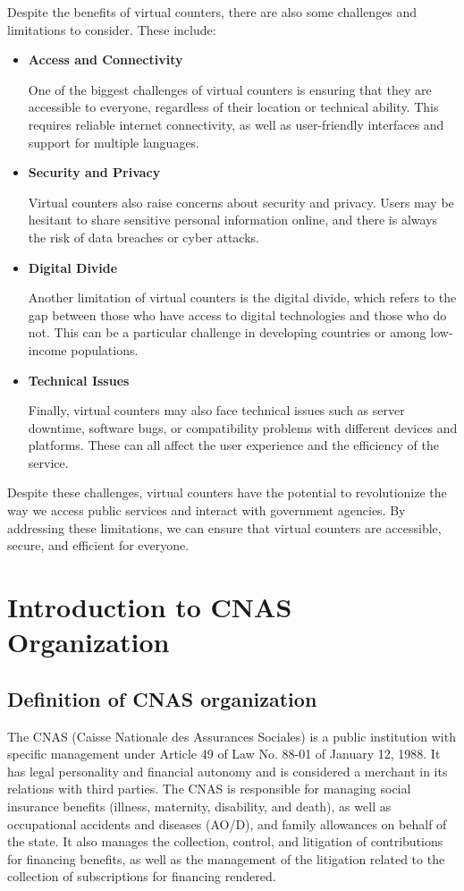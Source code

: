 Despite the benefits of virtual counters, there are also some challenges and limitations to consider. These include:
\begin{itemize}
    \item \textbf{Access and Connectivity}

One of the biggest challenges of virtual counters is ensuring that they are accessible to everyone, regardless of their location or technical ability. This requires reliable internet connectivity, as well as user-friendly interfaces and support for multiple languages.
\item \textbf{Security and Privacy}

Virtual counters also raise concerns about security and privacy. Users may be hesitant to share sensitive personal information online, and there is always the risk of data breaches or cyber attacks.
\item \textbf{Digital Divide}

Another limitation of virtual counters is the digital divide, which refers to the gap between those who have access to digital technologies and those who do not. This can be a particular challenge in developing countries or among low-income populations.
\item \textbf{Technical Issues}

Finally, virtual counters may also face technical issues such as server downtime, software bugs, or compatibility problems with different devices and platforms. These can all affect the user experience and the efficiency of the service.
\end{itemize}
Despite these challenges, virtual counters have the potential to revolutionize the way we access public services and interact with government agencies. By addressing these limitations, we can ensure that virtual counters are accessible, secure, and efficient for everyone.

\section{Introduction to CNAS Organization}
\subsection{Definition of CNAS organization}
The CNAS (Caisse Nationale des Assurances Sociales) is a public institution with specific management under Article 49 of Law No. 88-01 of January 12, 1988. It has legal personality and financial autonomy and is considered a merchant in its relations with third parties. The CNAS is responsible for managing social insurance benefits (illness, maternity, disability, and death), as well as occupational accidents and diseases (AO/D), and family allowances on behalf of the state. It also manages the collection, control, and litigation of contributions for financing benefits, as well as the management of the litigation related to the collection of subscriptions for financing rendered.


